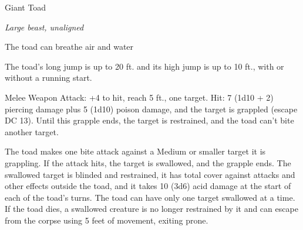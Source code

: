 \begin{monsterbox}{Giant Toad}
\begin{hangingpar}
\textit{Large beast, unaligned}
\end{hangingpar}
\dndline%
\basics[%
armorclass = 11,
hitpoints = 6d10 + 6,
speed = {20 ft., swim 40 ft.}
]
\dndline%
\stats[%
STR = \stat{15},
DEX = \stat{13},
CON = \stat{13},
INT = \stat{2},
WIS = \stat{10},
CHA = \stat{3}
]
\dndline%
\details[%
skills={},
damageimmunities={},
savingthrows={},
conditionimmunities={},
damageresistances={},
damagevulnerabilities={},
senses={darkvision 30 ft., passive Perception 10},
challenge=1
]
\dndline%
\begin{monsteraction}[Amphibious]
The toad can breathe air and water
\end{monsteraction}
\begin{monsteraction}
The toad's long jump is up to 20 ft. and its high jump is up to 10 ft., with or without a running start.
\end{monsteraction}
\begin{monsteraction}[Bite]
Melee Weapon Attack: +4 to hit, reach 5 ft., one target. Hit: 7 (1d10 + 2) piercing damage plus 5 (1d10) poison damage, and the target is grappled (escape DC 13). Until this grapple ends, the target is restrained, and the toad can't bite another target.
\end{monsteraction}
\begin{monsteraction}[Swallow]
The toad makes one bite attack against a Medium or smaller target it is grappling. If the attack hits, the target is swallowed, and the grapple ends. The swallowed target is blinded and restrained, it has total cover against attacks and other effects outside the toad, and it takes 10 (3d6) acid damage at the start of each of the toad's turns. The toad can have only one target swallowed at a time.
If the toad dies, a swallowed creature is no longer restrained by it and can escape from the corpse using 5 feet of movement, exiting prone.
\end{monsteraction}
\end{monsterbox}
